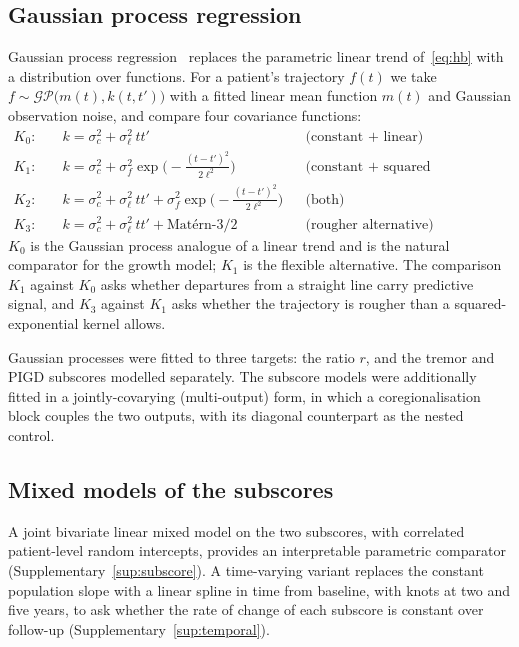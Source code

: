 \documentclass[11pt]{article}
\begin{document}
\subsection{Gaussian process regression}
\label{sec:gp}
Gaussian process regression~\citep{rasmussen2006} replaces the parametric linear
trend of~\eqref{eq:hb} with a distribution over functions. For a patient's
trajectory $f(t)$ we take $f \sim \mathcal{GP}\bigl(m(t), k(t,t')\bigr)$ with a
fitted linear mean function $m(t)$ and Gaussian observation noise, and compare
four covariance functions:
\begin{align*}
K_0:&\quad k = \sigma_c^2 + \sigma_\ell^2\, t t'  &&\text{(constant + linear)}\\
K_1:&\quad k = \sigma_c^2 + \sigma_f^2 \exp\!\bigl(-\tfrac{(t-t')^2}{2\ell^2}\bigr) &&\text{(constant + squared exponential)}\\
K_2:&\quad k = \sigma_c^2 + \sigma_\ell^2\, t t' + \sigma_f^2 \exp\!\bigl(-\tfrac{(t-t')^2}{2\ell^2}\bigr) &&\text{(both)}\\
K_3:&\quad k = \sigma_c^2 + \sigma_\ell^2\, t t' + \text{Mat\'ern-}3/2 &&\text{(rougher alternative)}
\end{align*}
$K_0$ is the Gaussian process analogue of a linear trend and is the natural
comparator for the growth model; $K_1$ is the flexible alternative. The
comparison $K_1$ against $K_0$ asks whether departures from a straight line carry
predictive signal, and $K_3$ against $K_1$ asks whether the trajectory is rougher
than a squared-exponential kernel allows.

Gaussian processes were fitted to three targets: the ratio $r$, and the tremor
and PIGD subscores modelled separately. The subscore models were additionally
fitted in a jointly-covarying (multi-output) form, in which a coregionalisation
block couples the two outputs, with its diagonal counterpart as the nested
control.

\subsection{Mixed models of the subscores}
A joint bivariate linear mixed model on the two subscores, with correlated
patient-level random intercepts, provides an interpretable parametric comparator
(Supplementary~\ref{sup:subscore}). A time-varying variant replaces the constant
population slope with a linear spline in time from baseline, with knots at two
and five years, to ask whether the rate of change of each subscore is constant
over follow-up (Supplementary~\ref{sup:temporal}).
\end{document}

